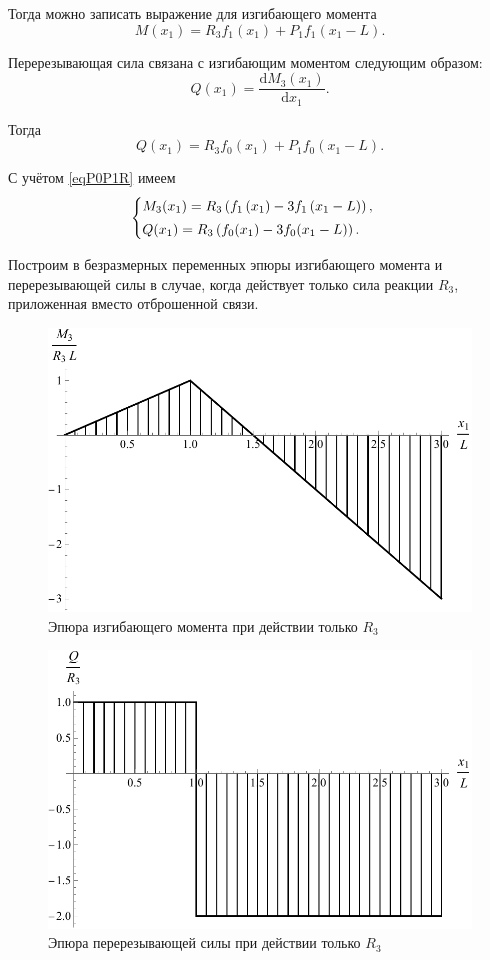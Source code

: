 \documentclass[12pt, a4paper]{article}
\begin{document}
	Тогда можно записать выражение для изгибающего момента
	\[
	M(x_1) = R_3 f_1(x_1) + P_1 f_1(x_1 - L).
	\]
	
	Перерезывающая сила связана с изгибающим моментом следующим образом:
	\begin{equation}
		Q(x_1) = \dfrac{\mathrm{d} M_3(x_1)}{\mathrm{d} x_1}.
		\label{eqQ}
	\end{equation}
	
	Тогда
	\[
	Q(x_1) = R_3 f_0(x_1) + P_1 f_0(x_1 - L).
	\]
	
	С учётом \eqref{eqP0P1R} имеем
	\begin{equation}
		\begin{cases} \vspace{0.25em}
			M_3(x_1) = R_3 \left( f_1\left(x_1\right) - 3 f_1\left(x_1 - L\right) \right), \\
			Q(x_1) = R_3 \left( f_0(x_1) - 3 f_0(x_1 - L) \right). \\
		\end{cases}
		\label{eqM3QR}
	\end{equation}
	
	Построим в безразмерных переменных эпюры изгибающего момента и перерезывающей силы в случае, когда действует только сила реакции $R_3$, приложенная вместо отброшенной связи.
	
	\begin{figure}[!h]
		\centering
		\includegraphics[width=0.75\linewidth]{plot-5}
		\caption{Эпюра изгибающего момента при действии только $R_3$}
	\end{figure} 
	
	\newpage
	
	\begin{figure}[!h]
		\centering
		\includegraphics[width=0.75\linewidth]{plot-6}
		\caption{Эпюра перерезывающей силы при действии только $R_3$}
	\end{figure}
	
\end{document}
